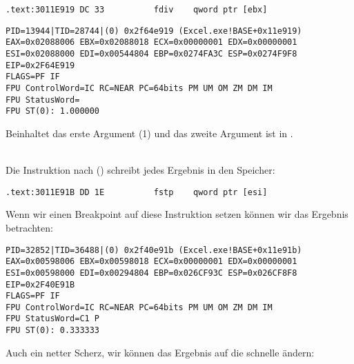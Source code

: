 
\begin{lstlisting}[style=customasmx86]
.text:3011E919 DC 33          fdiv    qword ptr [ebx]
\end{lstlisting}

\begin{lstlisting}
PID=13944|TID=28744|(0) 0x2f64e919 (Excel.exe!BASE+0x11e919)
EAX=0x02088006 EBX=0x02088018 ECX=0x00000001 EDX=0x00000001
ESI=0x02088000 EDI=0x00544804 EBP=0x0274FA3C ESP=0x0274F9F8
EIP=0x2F64E919
FLAGS=PF IF
FPU ControlWord=IC RC=NEAR PC=64bits PM UM OM ZM DM IM 
FPU StatusWord=
FPU ST(0): 1.000000
\end{lstlisting}

 Beinhaltet das erste Argument (1) und das zweite Argument ist in \TT{[EBX]}.\\
\\

Die Instruktion nach \FDIV () schreibt jedes Ergebnis in den Speicher:\\

\begin{lstlisting}[style=customasmx86]
.text:3011E91B DD 1E          fstp    qword ptr [esi]
\end{lstlisting}

Wenn wir einen Breakpoint auf diese Instruktion setzen können wir das Ergebnis betrachten:

\begin{lstlisting}
PID=32852|TID=36488|(0) 0x2f40e91b (Excel.exe!BASE+0x11e91b)
EAX=0x00598006 EBX=0x00598018 ECX=0x00000001 EDX=0x00000001
ESI=0x00598000 EDI=0x00294804 EBP=0x026CF93C ESP=0x026CF8F8
EIP=0x2F40E91B
FLAGS=PF IF
FPU ControlWord=IC RC=NEAR PC=64bits PM UM OM ZM DM IM 
FPU StatusWord=C1 P 
FPU ST(0): 0.333333
\end{lstlisting}

Auch ein netter Scherz, wir können das Ergebnis auf die schnelle ändern:

